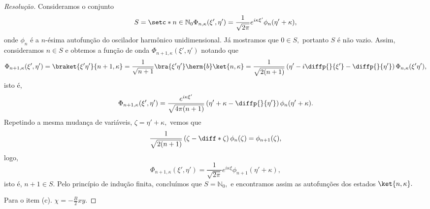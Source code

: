 \begin{proof}[Resolução]
   Consideramos o conjunto
   \begin{equation*}
      S = \setc*{n \in \mathbb{N}_0}{\Phi_{n, \kappa}(\xi', \eta') = \frac1{\sqrt{2\pi}} e^{i \kappa \xi'} \phi_n(\eta' + \kappa)},
   \end{equation*}
   onde \(\phi_n\) é a \(n\)-ésima autofunção do oscilador harmônico unidimensional. Já mostramos que \(0 \in S,\) portanto \(S\) é não vazio. Assim, consideramos \(n \in S\) e obtemos a função de onda \(\Phi_{n+1,\kappa}(\xi', \eta')\) notando que
   \begin{equation*}
      \Phi_{n+1,\kappa}(\xi', \eta') = \braket{\xi'\eta'}{n+1,\kappa} = \frac{1}{\sqrt{n+1}} \bra{\xi'\eta'} \herm{b}\ket{n,\kappa} = \frac{1}{\sqrt{2(n+1)}} \left(\eta' - i \diffp{}{\xi'} - \diffp{}{\eta'}\right)\Phi_{n,\kappa}(\xi'\eta'),
   \end{equation*}
   isto é,
   \begin{equation*}
      \Phi_{n+1,\kappa}(\xi', \eta') = \frac{e^{i\kappa \xi'}}{\sqrt{4\pi(n+1)}} \left(\eta' + \kappa - \diffp{}{\eta'}\right)\phi_n(\eta' + \kappa).
   \end{equation*}
   Repetindo a mesma mudança de variáveis, \(\zeta = \eta' + \kappa,\) vemos que
   \begin{equation*}
      \frac{1}{\sqrt{2(n+1)}} \left(\zeta - \diff*{}{\zeta}\right)\phi_n(\zeta) = \phi_{n+1}(\zeta),
   \end{equation*}
   logo,
   \begin{equation*}
      \Phi_{n+1,\kappa}(\xi', \eta') = \frac{1}{\sqrt{2\pi}} e^{i \kappa \xi} \phi_{n+1}(\eta' + \kappa),
   \end{equation*}
   isto é, \(n + 1 \in S.\) Pelo princípio de indução finita, concluímos que \(S = \mathbb{N}_0,\) e encontramos assim as autofunções dos estados \(\ket{n,\kappa}.\)


   Para o item (c). \(\chi = - \frac{B}2 xy.\)
\end{proof}
